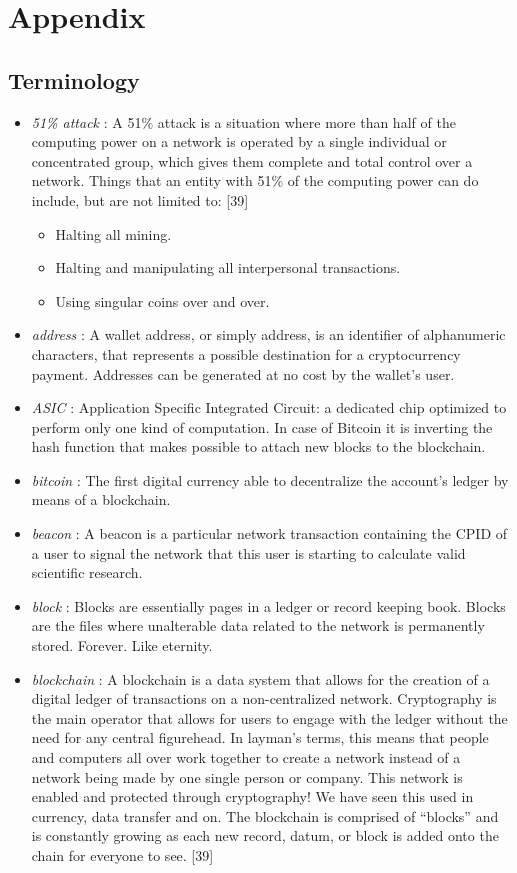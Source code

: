 \section{Appendix}

\subsection{Terminology}

\begin{itemize}
  \item \textit{51\% attack} : A 51\% attack is a situation where more than half of the computing power on a network is operated by a single individual or concentrated group, which   gives them complete and total control over a network. Things that an entity with 51\% of the computing power can do include, but are not limited to: [39]\\
  \begin{itemize}
	\item Halting all mining.
	\item Halting and manipulating all interpersonal transactions.
	\item Using singular coins over and over.
  \end{itemize}
  \item \textit{address} : A wallet address, or simply address, is an identifier of alphanumeric characters, that represents a possible destination for a cryptocurrency payment. Addresses can be generated at no cost by the wallet's user. 
  \item \textit{ASIC} : Application Specific Integrated Circuit: a dedicated chip optimized to perform only one kind of computation. In case of Bitcoin it is inverting the hash function that makes possible to attach new blocks to the blockchain.
  \item \textit{bitcoin} : The first digital currency able to decentralize the account's ledger by means of a blockchain. 
  \item \textit{beacon} : A beacon is a particular network transaction containing the CPID of a user to signal the network that this user is starting to calculate valid scientific research.
  \item \textit{block} : Blocks are essentially pages in a ledger or record keeping book. Blocks are the files where unalterable data related to the network is permanently stored. Forever. Like eternity.
  \item \textit{blockchain} : A blockchain is a data system that allows for the creation of a digital ledger of transactions on a non-centralized network. Cryptography is the main operator that allows for users to engage with the ledger without the need for any central figurehead. In layman’s terms, this means that people and computers all over work together to create a network instead of a network being made by one single person or company. This network is enabled and protected through cryptography! We have seen this used in currency, data transfer and on. The blockchain is comprised of “blocks” and is constantly growing as each new record, datum, or block is added onto the chain for everyone to see. [39]

\end{itemize}
